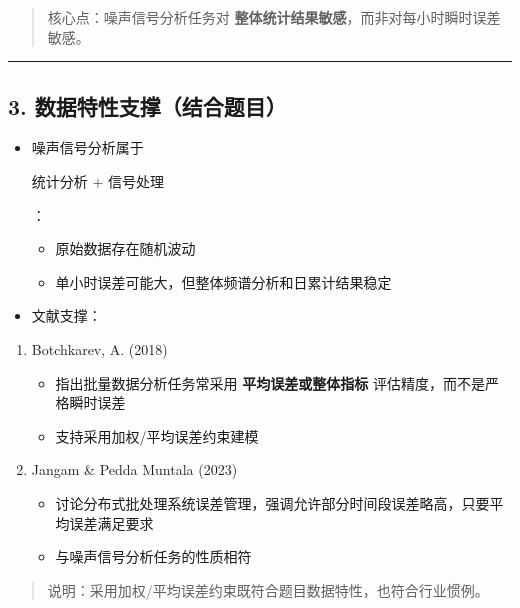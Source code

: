 \documentclass[
]{article}
\begin{document}
\begin{quote}
核心点：噪声信号分析任务对
\textbf{整体统计结果敏感}，而非对每小时瞬时误差敏感。
\end{quote}

\begin{center}\rule{0.5\linewidth}{0.5pt}\end{center}

\subsection{3.
数据特性支撑（结合题目）}\label{3-ux6570ux636eux7279ux6027ux652fux6491ux7ed3ux5408ux9898ux76eeuxff09}

\begin{itemize}
\item
  噪声信号分析属于

  统计分析 + 信号处理

  ：

  \begin{itemize}
  \item
    原始数据存在随机波动
  \item
    单小时误差可能大，但整体频谱分析和日累计结果稳定
  \end{itemize}
\item
  文献支撑：
\end{itemize}

\begin{enumerate}
\def\labelenumi{\arabic{enumi}.}
\item
  Botchkarev, A. (2018)

  \begin{itemize}
  \item
    指出批量数据分析任务常采用 \textbf{平均误差或整体指标}
    评估精度，而不是严格瞬时误差
  \item
    支持采用加权/平均误差约束建模
  \end{itemize}
\item
  Jangam \& Pedda Muntala (2023)

  \begin{itemize}
  \item
    讨论分布式批处理系统误差管理，强调允许部分时间段误差略高，只要平均误差满足要求
  \item
    与噪声信号分析任务的性质相符
  \end{itemize}
\end{enumerate}

\begin{quote}
说明：采用加权/平均误差约束既符合题目数据特性，也符合行业惯例。
\end{quote}
\end{document}
